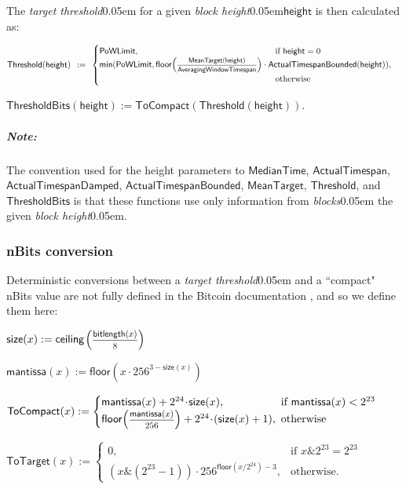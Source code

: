 \documentclass{article}
\renewcommand{\emph}[1]{\hspace{0.15em}{\fontfamily{pnc}\selectfont\scalebox{1.02}[0.999]{\textit{#1}}}\hspace{0.02em}}
\let\oldcite\cite
\renewcommand{\cite}[2][]{\raisebox{0ex}{\oldcite[{#1}]{#2}}}
\newcommand{\introlist}{\needspace{15ex}}
\numberwithin{theorem}{subsection}
\newcommand{\hfrac}[2]{\scalebox{0.8}{$\genfrac{}{}{0.5pt}{0}{#1}{#2}$}}
\newcommand{\term}[1]{\textsl{#1}\kern 0.05em\xspace}
\newcommand{\blocks}{\term{blocks}}
\newcommand{\blockHeight}{\term{block height}}
\newcommand{\squash}{\!\!\!}
\newcommand{\caseif}{\squash\text{if }}
\newcommand{\caseotherwise}{\squash\text{otherwise}}
\newcommand{\bitlength}{\mathsf{bitlength}}
\newcommand{\size}{\mathsf{size}}
\newcommand{\mantissa}{\mathsf{mantissa}}
\newcommand{\ToCompact}{\mathsf{ToCompact}}
\newcommand{\ToTarget}{\mathsf{ToTarget}}
\newcommand{\minimum}{\mathsf{min}}
\newcommand{\floor}[1]{\mathsf{floor}\!\left({#1}\right)}
\newcommand{\ceiling}[1]{\mathsf{ceiling}\kern-0.06em\left({#1}\right)}
\newcommand{\band}{\binampersand}
\newcommand{\mult}{\cdot}
\newcommand{\smult}{\!\cdot\!}
\newcommand{\BlockHeight}{\mathsf{height}}
\newcommand{\PoWLimit}{\mathsf{PoWLimit}}
\newcommand{\MeanTarget}{\mathsf{MeanTarget}}
\newcommand{\MedianTime}{\mathsf{MedianTime}}
\newcommand{\AveragingWindowTimespan}{\mathsf{AveragingWindowTimespan}}
\newcommand{\ActualTimespan}{\mathsf{ActualTimespan}}
\newcommand{\ActualTimespanDamped}{\mathsf{ActualTimespanDamped}}
\newcommand{\ActualTimespanBounded}{\mathsf{ActualTimespanBounded}}
\newcommand{\Threshold}{\mathsf{Threshold}}
\newcommand{\ThresholdBits}{\mathsf{ThresholdBits}}
\newcommand{\targetThreshold}{\term{target threshold}}
\newcommand{\pnote}[1]{\subparagraph{Note:}{#1}}
\begin{document}
\introlist
The \targetThreshold for a given \blockHeight $\BlockHeight$ is then calculated as:

\begin{formulae}
  \item $\Threshold(\BlockHeight) \hspace{0.43em} := \hspace{0.43em} \begin{cases}
               \PoWLimit, \hspace{16em}\text{if } \BlockHeight = 0 \\
               \minimum(\PoWLimit, \floor{\hfrac{\MeanTarget(\BlockHeight)}{\AveragingWindowTimespan}}
                                   \mult \ActualTimespanBounded(\BlockHeight)),\\
                          \hspace{20.7em}\text{otherwise}
             \end{cases}$
  \item $\ThresholdBits(\BlockHeight) := \ToCompact(\Threshold(\BlockHeight))$.
\end{formulae}

\vspace{-2ex}
\pnote{
The convention used for the height parameters to $\MedianTime$, $\ActualTimespan$,
$\ActualTimespanDamped$, $\ActualTimespanBounded$, $\MeanTarget$, $\Threshold$, and
$\ThresholdBits$ is that these functions use only information from \blocks \emph{preceding}
the given \blockHeight.
}

\introlist
\subsubsection{nBits conversion} \label{nbits}

Deterministic conversions between a \targetThreshold and a ``compact" nBits value are not
fully defined in the Bitcoin documentation \cite{Bitcoin-nBits}, and so we define them here:

\begin{formulae}[leftmargin=1.5em,label=]
  \item $\size(x) := \ceiling{\hfrac{\bitlength(x)}{8}}$
  \item $\mantissa(x) := \floor{x \mult 256^{3 - \size(x)}}$
  \item $\ToCompact(x) := \begin{cases}
          \mantissa(x) + 2^{24} \smult \size(x),&\caseif \mantissa(x) < 2^{23} \\
          \floor{\hfrac{\mantissa(x)}{256}} + 2^{24} \smult (\size(x)+1),&\caseotherwise
        \end{cases}$
  \item $\ToTarget(x) := \begin{cases}
          0,&\caseif x \band 2^{23} = 2^{23} \\
          (x \band (2^{23}-1)) \mult 256^{\floor{x / 2^{24}} - 3},&\caseotherwise.
        \end{cases}$
\end{formulae}
\end{document}
